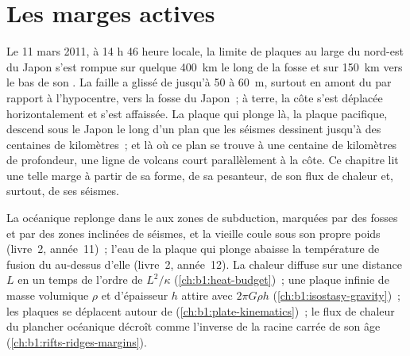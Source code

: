 \chapter{Les marges actives}\label{ch:b1:active-margins}

Le 11 mars 2011, à 14 h 46 heure locale, la limite de plaques au large du nord-est du Japon
s'est rompue sur quelque \qty{400}{km} le long de la fosse et sur \qty{150}{km} vers le bas de son .
La faille a glissé de jusqu'à 50 à \qty{60}{m}, surtout en amont du  par rapport à
l'hypocentre, vers la fosse du Japon~; à terre, la côte s'est déplacée horizontalement et
s'est affaissée. La plaque qui plonge là, la plaque pacifique, descend sous
le Japon le long d'un plan que les séismes dessinent jusqu'à des centaines de kilomètres~;
et là où ce plan se trouve à une centaine de kilomètres de profondeur, une ligne de volcans
court parallèlement à la côte. Ce chapitre lit une telle marge à partir de sa forme,
de sa pesanteur, de son flux de chaleur et, surtout, de ses séismes.

\begin{recall}
La  océanique replonge dans le  aux zones de subduction, marquées par
des fosses et par des zones inclinées de séismes, et la vieille  coule sous
son propre poids (livre~2, année~11)~; l'eau de la plaque qui plonge abaisse la
température de fusion du  au-dessus d'elle (livre~2, année~12). La chaleur diffuse
sur une distance $L$ en un temps de l'ordre de $L^2/\kappa$ (\cref{ch:b1:heat-budget})~;
une plaque infinie de masse volumique $\rho$ et d'épaisseur $h$ attire avec $2\pi G\rho h$
(\cref{ch:b1:isostasy-gravity})~; les plaques se déplacent autour de 
(\cref{ch:b1:plate-kinematics})~; le flux de chaleur du plancher océanique décroît comme
l'inverse de la racine carrée de son âge (\cref{ch:b1:rifts-ridges-margins}).
\end{recall}

